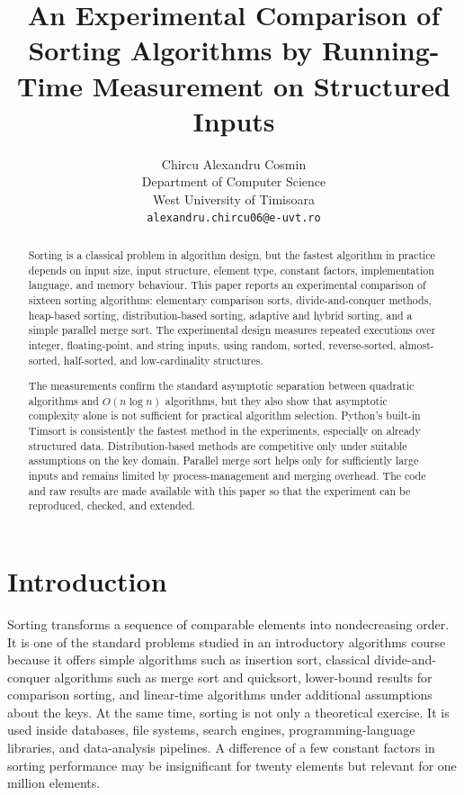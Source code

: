 \documentclass[11pt,a4paper]{article}
\title{An Experimental Comparison of Sorting Algorithms by Running-Time Measurement on Structured Inputs}
\author{Chircu Alexandru Cosmin\\Department of Computer Science\\West University of Timisoara\\\texttt{alexandru.chircu06@e-uvt.ro}}
\date{}
\begin{document}
\maketitle

\begin{abstract}
Sorting is a classical problem in algorithm design, but the fastest algorithm in practice depends on input size, input structure, element type, constant factors, implementation language, and memory behaviour. This paper reports an experimental comparison of sixteen sorting algorithms: elementary comparison sorts, divide-and-conquer methods, heap-based sorting, distribution-based sorting, adaptive and hybrid sorting, and a simple parallel merge sort. The experimental design measures repeated executions over integer, floating-point, and string inputs, using random, sorted, reverse-sorted, almost-sorted, half-sorted, and low-cardinality structures.

The measurements confirm the standard asymptotic separation between quadratic algorithms and $O(n\log n)$ algorithms, but they also show that asymptotic complexity alone is not sufficient for practical algorithm selection. Python's built-in Timsort is consistently the fastest method in the experiments, especially on already structured data. Distribution-based methods are competitive only under suitable assumptions on the key domain. Parallel merge sort helps only for sufficiently large inputs and remains limited by process-management and merging overhead. The code and raw results are made available with this paper so that the experiment can be reproduced, checked, and extended.
\end{abstract}

\section{Introduction}

Sorting transforms a sequence of comparable elements into nondecreasing order. It is one of the standard problems studied in an introductory algorithms course because it offers simple algorithms such as insertion sort, classical divide-and-conquer algorithms such as merge sort and quicksort, lower-bound results for comparison sorting, and linear-time algorithms under additional assumptions about the keys. At the same time, sorting is not only a theoretical exercise. It is used inside databases, file systems, search engines, programming-language libraries, and data-analysis pipelines. A difference of a few constant factors in sorting performance may be insignificant for twenty elements but relevant for one million elements.
\end{document}
